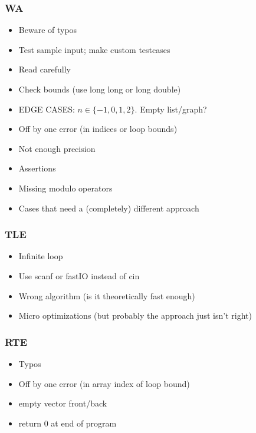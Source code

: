 \documentclass[
	a4paper,
	landscape,
	10pt,
	article
]{article}
\begin{document}
\subsubsection*{WA}
\begin{itemize}
	\setlength\itemsep{0em}
	\item Beware of typos
	\item Test sample input; make custom testcases
	\item Read carefully
	\item Check bounds (use long long or long double)
	\item EDGE CASES: $n\in\{-1,0,1,2\}$. Empty list/graph?
	\item Off by one error (in indices or loop bounds)
	\item Not enough precision
	\item Assertions
	\item Missing modulo operators
	\item Cases that need a (completely) different approach
\end{itemize}

\subsubsection*{TLE}
\begin{itemize}
	\setlength\itemsep{0em}
	\item Infinite loop
	\item Use scanf or fastIO instead of cin
	\item Wrong algorithm (is it theoretically fast enough)
	\item Micro optimizations (but probably the approach just isn't right)
\end{itemize}

\subsubsection*{RTE}
\begin{itemize}
	\setlength\itemsep{0em}
	\item Typos
	\item Off by one error (in array index of loop bound)
	\item empty vector front/back
	\item return 0 at end of program
\end{itemize}
\end{document}
